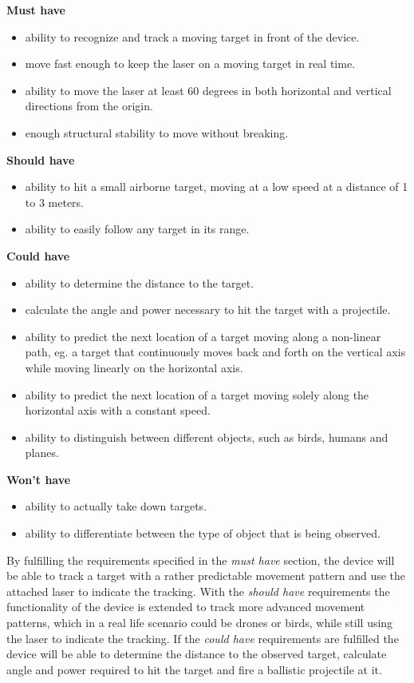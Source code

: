 \textbf{Must have}
\begin{itemize}
	\item ability to recognize and track a moving target in front of the device.
	\item move fast enough to keep the laser on a moving target in real time.
	\item ability to move the laser at least 60 degrees in both horizontal and vertical directions from the origin.
	\item enough structural stability to move without breaking.
\end{itemize}

\textbf{Should have}
\begin{itemize}
	\item ability to hit a small airborne target, moving at a low speed at a distance of 1 to 3 meters.
	\item ability to easily follow any target in its range.
	
\end{itemize}

\textbf{Could have}
\begin{itemize}
	\item ability to determine the distance to the target.
	\item calculate the angle and power necessary to hit the target with a projectile.
	\item ability to predict the next location of a target moving along a non-linear path, eg{.} a target that continuously moves back and forth on the vertical axis while moving linearly on the horizontal axis.
	\item ability to predict the next location of a target moving solely along the horizontal axis with a constant speed.
	\item ability to distinguish between different objects, such as birds, humans and planes.
\end{itemize}

\textbf{Won't have}
\begin{itemize}
	\item ability to actually take down targets.
	\item ability to differentiate between the type of object that is being observed.
\end{itemize}

By fulfilling the requirements specified in the \textit{must have} section, the device will be able to track a target with a rather predictable movement pattern and use the attached laser to indicate the tracking.
With the \textit{should have} requirements the functionality of the device is extended to track more advanced movement patterns, which in a real life scenario could be drones or birds, while still using the laser to indicate the tracking.
If the \textit{could have} requirements are fulfilled the device will be able to determine the distance to the observed target, calculate angle and power required to hit the target and fire a ballistic projectile at it.

